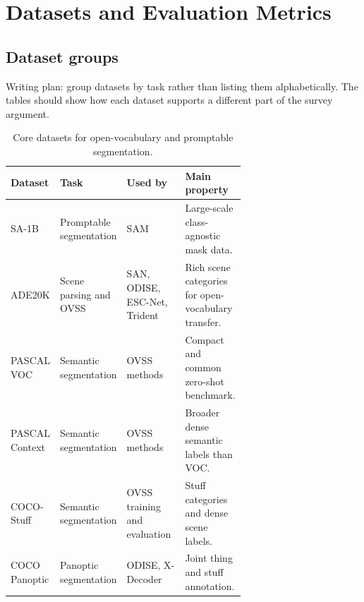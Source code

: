 \section{Datasets and Evaluation Metrics}
\label{sec:datasets-metrics}

\subsection{Dataset groups}
\label{subsec:dataset-groups}
Writing plan: group datasets by task rather than listing them alphabetically. The tables should show how each dataset supports a different part of the survey argument.

\begin{table}[t]
\centering
\small
\caption{Core datasets for open-vocabulary and promptable segmentation.}
\label{tab:datasets-core}
\begin{tabularx}{\linewidth}{p{0.18\linewidth} p{0.23\linewidth} p{0.25\linewidth} X}
\toprule
Dataset & Task & Used by & Main property \\
\midrule
SA-1B & Promptable segmentation & SAM \citep{kirillov2023sam} & Large-scale class-agnostic mask data. \\
ADE20K & Scene parsing and OVSS & SAN, ODISE, ESC-Net, Trident \citep{xu2023san,xu2023odise,lee2025escnet,shi2025trident} & Rich scene categories for open-vocabulary transfer. \\
PASCAL VOC & Semantic segmentation & OVSS methods \citep{liang2023ovseg,xu2023san,luo2024pnpovss} & Compact and common zero-shot benchmark. \\
PASCAL Context & Semantic segmentation & OVSS methods \citep{liang2023ovseg,xu2023san} & Broader dense semantic labels than VOC. \\
COCO-Stuff & Semantic segmentation & OVSS training and evaluation \citep{xu2023san,liang2023ovseg} & Stuff categories and dense scene labels. \\
COCO Panoptic & Panoptic segmentation & ODISE, X-Decoder \citep{xu2023odise,zou2023xdecoder} & Joint thing and stuff annotation. \\
\bottomrule
\end{tabularx}
\end{table}

